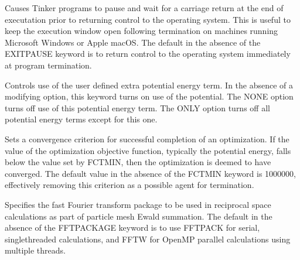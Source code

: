 \documentclass[letterpaper,11pt,english]{sphinxmanual}
\begin{document}
\ignorespaces {}\label{\detokenize{text/keywords:key-exit-pause}}\begin{description}
\sphinxAtStartPar
Causes Tinker programs to pause and wait for a carriage return at the end of executation prior to returning control to the operating system. This is useful to keep the execution window open following termination on machines running Microsoft Windows or Apple macOS. The default in the absence of the EXIT\sphinxhyphen{}PAUSE keyword is to return control to the operating system immediately at program termination.

\end{description}

\ignorespaces {}\label{\detokenize{text/keywords:key-extraterm}}\begin{description}
\sphinxAtStartPar
Controls use of the user defined extra potential energy term. In the absence of a modifying option, this keyword turns on use of the potential. The NONE option turns off use of this potential energy term. The ONLY option turns off all potential energy terms except for this one.

\end{description}

\ignorespaces {}\label{\detokenize{text/keywords:key-fctmin}}\begin{description}
\sphinxAtStartPar
Sets a convergence criterion for successful completion of an optimization. If the value of the optimization objective function, typically the potential energy, falls below the value set by FCTMIN, then the optimization is deemed to have converged. The default value in the absence of the FCTMIN keyword is \sphinxhyphen{}1000000, effectively removing this criterion as a possible agent for termination.

\end{description}

\ignorespaces {}\label{\detokenize{text/keywords:key-fft-package}}\begin{description}
\sphinxAtStartPar
Specifies the fast Fourier transform package to be used in reciprocal space calculations as part of particle mesh Ewald summation. The default in the absence of the FFT\sphinxhyphen{}PACKAGE keyword is to use FFTPACK for serial, single\sphinxhyphen{}threaded calculations, and FFTW for OpenMP parallel calculations using multiple threads.

\end{description}
\end{document}
